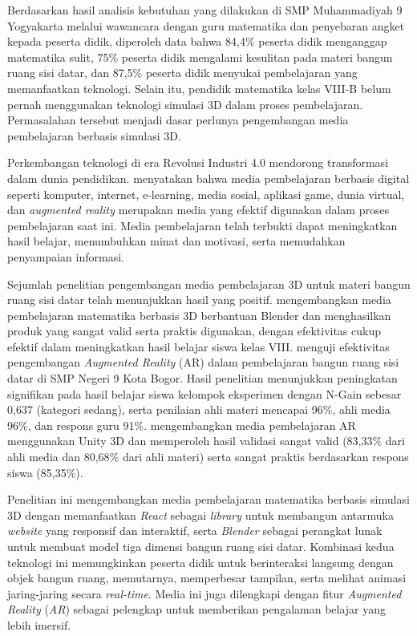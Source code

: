 \hspace*{1cm}Berdasarkan hasil analisis kebutuhan yang dilakukan di SMP Muhammadiyah 9 Yogyakarta melalui wawancara dengan guru matematika dan penyebaran angket kepada peserta didik, diperoleh data bahwa 84,4\% peserta didik menganggap matematika sulit, 75\% peserta didik mengalami kesulitan pada materi bangun ruang sisi datar, dan 87,5\% peserta didik menyukai pembelajaran yang memanfaatkan teknologi. Selain itu, pendidik matematika kelas VIII-B belum pernah menggunakan teknologi simulasi 3D dalam proses pembelajaran. Permasalahan tersebut menjadi dasar perlunya pengembangan media pembelajaran berbasis simulasi 3D.

\hspace*{1cm}Perkembangan teknologi di era Revolusi Industri 4.0 mendorong transformasi dalam dunia pendidikan. \citet{pulungan2022} menyatakan bahwa media pembelajaran berbasis digital seperti komputer, internet, e-learning, media sosial, aplikasi game, dunia virtual, dan \textit{augmented reality} merupakan media yang efektif digunakan dalam proses pembelajaran saat ini. Media pembelajaran telah terbukti dapat meningkatkan hasil belajar, menumbuhkan minat dan motivasi, serta memudahkan penyampaian informasi.

\hspace*{1cm}Sejumlah penelitian pengembangan media pembelajaran 3D untuk materi bangun ruang sisi datar telah menunjukkan hasil yang positif. \citet{arrasyid2024} mengembangkan media pembelajaran matematika berbasis 3D berbantuan Blender dan menghasilkan produk yang sangat valid serta praktis digunakan, dengan efektivitas cukup efektif dalam meningkatkan hasil belajar siswa kelas VIII. \citet{yasmin2025} menguji efektivitas pengembangan \textit{Augmented Reality} (AR) dalam pembelajaran bangun ruang sisi datar di SMP Negeri 9 Kota Bogor. Hasil penelitian menunjukkan peningkatan signifikan pada hasil belajar siswa kelompok eksperimen dengan N-Gain sebesar 0,637 (kategori sedang), serta penilaian ahli materi mencapai 96\%, ahli media 96\%, dan respons guru 91\%. \citet{rizwandyka2025} mengembangkan media pembelajaran AR menggunakan Unity 3D dan memperoleh hasil validasi sangat valid (83,33\% dari ahli media dan 80,68\% dari ahli materi) serta sangat praktis berdasarkan respons siswa (85,35\%).

\hspace*{1cm}Penelitian ini mengembangkan media pembelajaran matematika berbasis simulasi 3D dengan memanfaatkan \textit{React} sebagai \textit{library} untuk membangun antarmuka \textit{website} yang responsif dan interaktif, serta \textit{Blender} sebagai perangkat lunak untuk membuat model tiga dimensi bangun ruang sisi datar. Kombinasi kedua teknologi ini memungkinkan peserta didik untuk berinteraksi langsung dengan objek bangun ruang, memutarnya, memperbesar tampilan, serta melihat animasi jaring-jaring secara \textit{real-time}. Media ini juga dilengkapi dengan fitur \textit{Augmented Reality} (\textit{AR}) sebagai pelengkap untuk memberikan pengalaman belajar yang lebih imersif.

